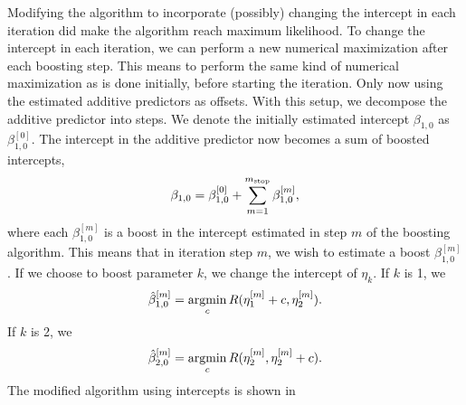 Modifying the algorithm to incorporate (possibly) changing the intercept in each iteration did make the algorithm reach maximum likelihood.
To change the intercept in each iteration, we can perform a new numerical maximization after each boosting step.
This means to perform the same kind of numerical maximization as is done initially, before starting the iteration.
Only now using the estimated additive predictors as offsets.
With this setup, we decompose the additive predictor into steps.
We denote the initially estimated intercept $\beta_{1,0}$ as $\beta_{1,0}^{[0]}$.
The intercept in the additive predictor now becomes a sum of boosted intercepts,
\begin{equation}
    \beta_{1,0}=\beta_{1,0}^{[0]}+\sum_{m=1}^{m_{\text{stop}}}\beta_{1,0}^{[m]},
\end{equation}
where each $\beta_{1,0}^{[m]}$ is a boost in the intercept estimated in step $m$ of the boosting algorithm.
This means that in iteration step $m$, we wish to estimate a boost $\beta_{1,0}^{[m]}$.
If we choose to boost parameter $k$, we change the intercept of $\eta_k$.
If $k$ is 1, we 
\begin{equation}
    \hat{\beta}_{1,0}^{[m]}=\operatorname*{argmin}_{c}R(\eta_1^{[m]}+c,\eta_2^{[m]}).
\end{equation}
If $k$ is 2, we 
\begin{equation}
    \hat{\beta}_{2,0}^{[m]}=\operatorname*{argmin}_{c}R(\eta_2^{[m]},\eta_2^{[m]}+c).
\end{equation}
The modified algorithm using intercepts is shown in


